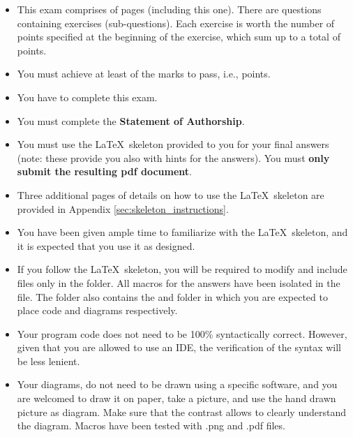 
\begin{itemize}
	\setlength\itemsep{0em}
	\item This exam comprises of \epages pages (including this one).  There are \equestions questions containing exercises (sub-questions). Each exercise is worth the number of points specified at the beginning of the exercise, which sum up to a total of \epoints points.
	\item You must achieve at least \ethreshold of the marks to pass, i.e., \epointstopass points.
	\item You have \elength to complete this exam.
	\item You must complete the \textbf{Statement of Authorship}.
	\item You must use the \LaTeX\ skeleton provided to you for your final answers (note: these provide you also with hints for the answers).  You must \textbf{only submit the resulting pdf document}. 
	\item Three additional pages of details on how to use the \LaTeX\ skeleton are provided in Appendix \ref{sec:skeleton_instructions}.
	\end{itemize}

\vfill
\begin{itemize}
	\setlength\itemsep{0em}
	\item You have been given ample time to familiarize with the \LaTeX\ skeleton, and it is expected that you use it as designed.
	\item If you follow the \LaTeX\ skeleton, you will be required to modify and include files only in the  folder.  All macros for the answers have been isolated in the  file.  The folder also contains the  and  folder in which you are expected to place code and diagrams respectively.
	\item Your program code does not need to be 100\% syntactically correct.  However, given that you are allowed to use an IDE, the verification of the syntax will be less lenient.
	\item Your diagrams, do not need to be drawn using a specific software, and you are welcomed to draw it on paper, take a picture, and use the hand drawn picture as diagram.  Make sure that the contrast allows to clearly understand the diagram.  Macros have been tested with .png and .pdf files.
\end{itemize}



